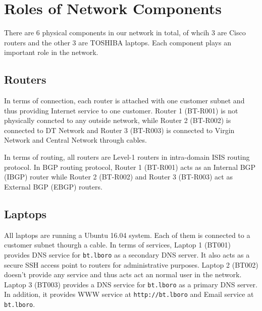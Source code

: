 \section{Roles of Network Components}
\label{sec:components}

There are 6 physical components in our network in total, of whcih 3 are Cisco routers and the other 3 are TOSHIBA laptops. Each component plays an important role in the network.

\subsection{Routers}
In terms of connection, each router is attached with one customer subnet and thus providing Internet service to one customer. Router 1 (BT-R001) is not physically conncted to any outside network, while Router 2 (BT-R002) is connected to DT Network and Router 3 (BT-R003) is connected to Virgin Network and Central Network through cables.

In terms of routing, all routers are Level-1 routers in intra-domain ISIS routing protocol. In BGP routing protocol, Router 1 (BT-R001) acts as an Internal BGP (IBGP) router while Router 2 (BT-R002) and Router 3 (BT-R003) act as External BGP (EBGP) routers. 



\subsection{Laptops}

All laptops are running a Ubuntu 16.04 system. Each of them is connected to a customer subnet thourgh a cable. 
In terms of services, Laptop 1 (BT001) provides DNS service for \texttt{bt.lboro} as a secondary DNS server. It also acts as a secure SSH access point to routers for administrative purposes. 
Laptop 2 (BT002) doesn't provide any service and thus acts act an normal user in the network. 
Laptop 3 (BT003) provides a DNS service for \texttt{bt.lboro} as a primary DNS server. In addition, it provides WWW service at \texttt{http://bt.lboro} and Email service at \texttt{bt.lboro}.

